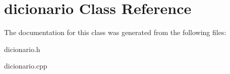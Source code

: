 \hypertarget{classdicionario}{}\section{dicionario Class Reference}
\label{classdicionario}


The documentation for this class was generated from the following files\+:\begin{DoxyCompactItemize}
\item 
dicionario.\+h\item 
dicionario.\+cpp\end{DoxyCompactItemize}
